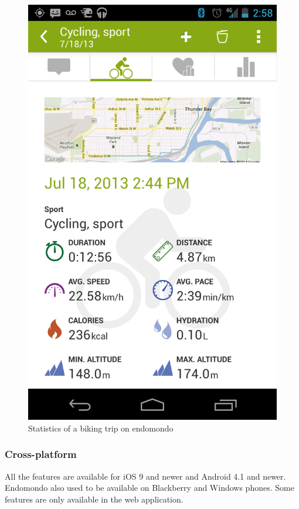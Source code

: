 \begin{figure}[h]
    \includegraphics[width=\textwidth]{Images/endomondo-bike-stats.png}
    \caption{Statistics of a biking trip on endomondo\cite{endomondo-bike-stats-img}}
\end{figure}

\subsubsection*{Cross-platform}
All the features are available for iOS 9 and newer and Android 4.1 and newer.
Endomondo also used to be available on Blackberry and Windows phones.
Some features are only available in the web application.
